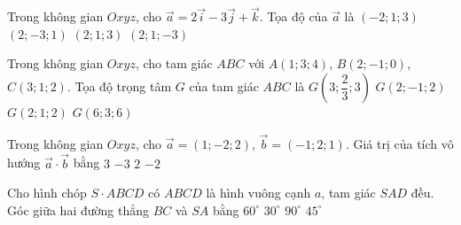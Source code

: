  \begin{ex}%
 	Trong không gian $Oxyz$, cho $\overrightarrow{a}=2 \overrightarrow{i}-3
 	\overrightarrow{j}+\overrightarrow{k}$. Tọa độ của $\overrightarrow{a}$ là
 	\choice
 	{$(-2;1;3)$}
 	{\True $(2;-3;1)$}
 	{$(2;1;3)$}
 	{$(2;1;-3)$}
 	
 \end{ex}
 \begin{ex}%
 	Trong không gian $Oxyz$, cho tam giác $ABC$ với $A(1;3;4)$, $B(2;-1;0)$, $C(3;1;2)$. Tọa độ trọng tâm $G$ của tam giác $ABC$ là
 	\choice
 	{$G\left(3;\dfrac{2}{3};3\right)$}
 	{$G(2;-1;2)$}
 	{\True $G(2;1;2)$}
 	{$G(6;3;6)$}
 \end{ex}
 \begin{ex}%
 	Trong không gian $Oxyz$, cho $\overrightarrow{a}=(1;-2;2)$, $\overrightarrow{b}=(-1;2;1)$. Giá trị của tích vô hướng $\overrightarrow{a} \cdot \overrightarrow{b}$ bằng
 	\choice
 	{$3$}
 	{\True $-3$}
 	{$2$}
 	{$-2$}
 \end{ex}
 \begin{ex}%
 	Cho hình chóp $S \cdot ABCD$ có $ABCD$ là hình vuông cạnh $a$, tam giác $SAD$ đều. Góc giữa hai đường thẳng $BC$ và $SA$ bằng
 	\choice
 	{\True $60^{\circ}$}
 	{$30^{\circ}$}
 	{$90^{\circ}$}
 	{$45^{\circ}$}
 	
 \end{ex}
